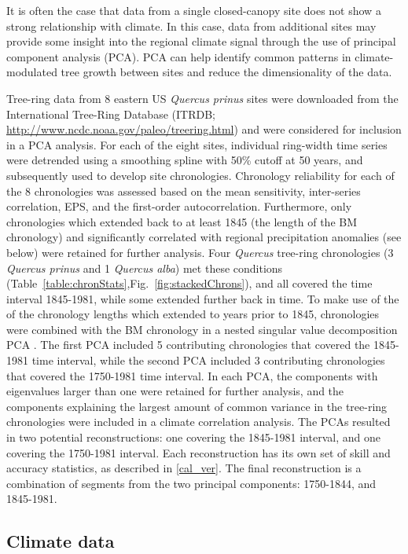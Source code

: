 It is often the case that data from a single closed-canopy site does
not show a strong relationship with climate. In this case, data from
additional sites may provide some insight into the regional climate
signal through the use of principal component analysis (PCA). PCA can
help identify common patterns in climate-modulated tree growth between
sites and reduce the dimensionality of the data.

Tree-ring data from 8 eastern US \textit{Quercus prinus} sites
were downloaded from the International Tree-Ring Database (ITRDB;
\url{http://www.ncdc.noaa.gov/paleo/treering.html}) and were
considered for inclusion in a PCA analysis. For each of the eight
sites, individual ring-width time series were detrended using a
smoothing spline with 50\% cutoff at 50 years, and subsequently used
to develop site chronologies. Chronology reliability for each of the 8
chronologies was assessed based on the mean sensitivity, inter-series
correlation, EPS, and the first-order autocorrelation. Furthermore,
only chronologies which extended back to at least 1845 (the
length of the BM chronology) and significantly correlated with
regional precipitation anomalies (see below) were retained for
further analysis. Four \textit{Quercus} tree-ring chronologies (3
\textit{Quercus prinus} and 1 \textit{Quercus alba}) met these conditions
(Table~\ref{table:chronStats},Fig.~\ref{fig:stackedChrons}), and all
covered the time interval 1845-1981, while some extended further back
in time. To make use of the of the chronology lengths which extended to
years prior to 1845, chronologies were combined with the BM chronology
in a nested singular value decomposition PCA \cite{wold1987principal,
cook2007north}. The first PCA included 5 contributing chronologies that
covered the 1845-1981 time interval, while the second PCA included 3
contributing chronologies that covered the 1750-1981 time interval. In
each PCA, the components with eigenvalues larger than one were retained
for further analysis, and the components explaining the largest amount of
common variance in the tree-ring chronologies were included in a climate
correlation analysis. The PCAs resulted in two potential reconstructions:
one covering the 1845-1981 interval, and one covering the 1750-1981
interval. Each reconstruction has its own set of skill and accuracy
statistics, as described in \ref{cal_ver}. The final reconstruction is
a combination of segments from the two principal components: 1750-1844,
and 1845-1981.

\subsection{Climate data}

